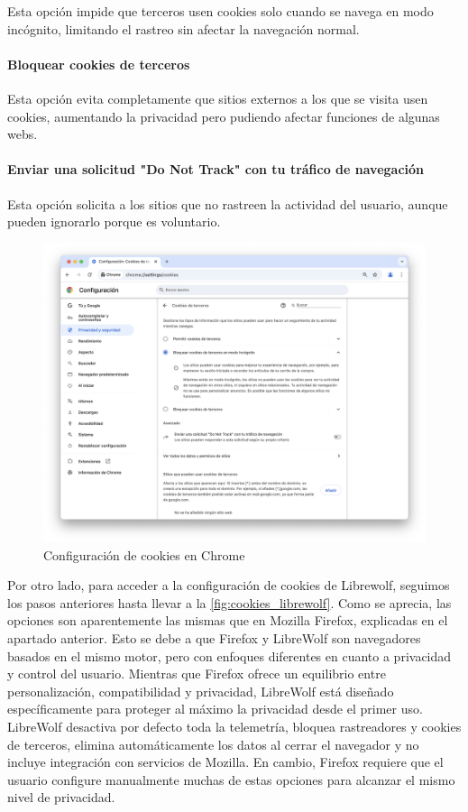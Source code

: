 Esta opción impide que terceros usen cookies solo cuando se navega en modo incógnito, limitando el rastreo sin afectar la navegación normal. 

\paragraph{Bloquear cookies de terceros}

Esta opción evita completamente que sitios externos a los que se visita usen cookies, aumentando la privacidad pero pudiendo afectar funciones de algunas webs. 

\paragraph{Enviar una solicitud "Do Not Track" con tu tráfico de navegación }

Esta opción solicita a los sitios que no rastreen la actividad del usuario, aunque pueden ignorarlo porque es voluntario. 

\begin{figure}[H]   
    \centering
    \includegraphics[width=\textwidth]{cookies_chrome_ej14a.png}
    \caption{Configuración de cookies en Chrome}
    \label{fig:cookies_chrome}
\end{figure}

Por otro lado, para acceder a la configuración de cookies de Librewolf, seguimos los pasos anteriores hasta llevar a la \ref{fig:cookies_librewolf}. Como se aprecia, las opciones son aparentemente las mismas que en Mozilla Firefox, explicadas en el apartado anterior. Esto se debe a que Firefox y LibreWolf son navegadores basados en el mismo motor, pero con enfoques diferentes en cuanto a privacidad y control del usuario. Mientras que Firefox ofrece un equilibrio entre personalización, compatibilidad y privacidad, LibreWolf está diseñado específicamente para proteger al máximo la privacidad desde el primer uso. LibreWolf desactiva por defecto toda la telemetría, bloquea rastreadores y cookies de terceros, elimina automáticamente los datos al cerrar el navegador y no incluye integración con servicios de Mozilla. En cambio, Firefox requiere que el usuario configure manualmente muchas de estas opciones para alcanzar el mismo nivel de privacidad. 

